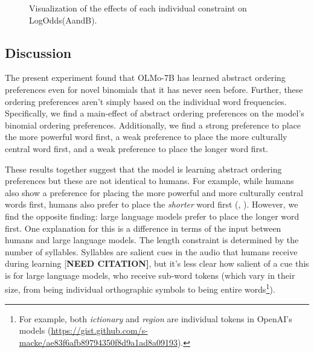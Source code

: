 \documentclass[
  nottoc]{article}
\begin{document}
\begin{figure}


\caption{\label{fig-exp1m2}Visualization of the effects of each
individual constraint on LogOdds(AandB).}

\end{figure}%

\subsection{Discussion}\label{discussion}

The present experiment found that OLMo-7B has learned abstract ordering
preferences even for novel binomials that it has never seen before.
Further, these ordering preferences aren't simply based on the
individual word frequencies. Specifically, we find a main-effect of
abstract ordering preferences on the model's binomial ordering
preferences. Additionally, we find a strong preference to place the more
powerful word first, a weak preference to place the more culturally
central word first, and a weak preference to place the longer word
first.

These results together suggest that the model is learning abstract
ordering preferences but these are not identical to humans. For example,
while humans also show a preference for placing the more powerful and
more culturally central words first, humans also prefer to place the
\emph{shorter} word first
(, ).
However, we find the opposite finding: large language models prefer to
place the longer word first. One explanation for this is a difference in
terms of the input between humans and large language models. The length
constraint is determined by the number of syllables. Syllables are
salient cues in the audio that humans receive during learning
{[}\textbf{NEED CITATION{]}}, but it's less clear how salient of a cue
this is for large language models, who receive sub-word tokens (which
vary in their size, from being individual orthographic symbols to being
entire words\footnote{For example, both \emph{ictionary} and
  \emph{region} are individual tokens in OpenAI's models
  (\url{https://gist.github.com/s-macke/ae83f6afb89794350f8d9a1ad8a09193}).}).
\end{document}
